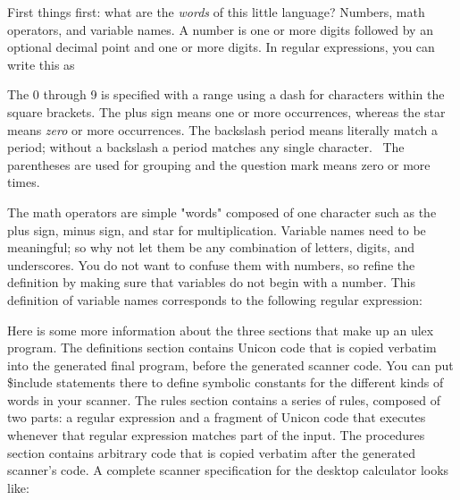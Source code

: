 First things first: what are the \emph{words} of this little language?
Numbers, math operators, and variable names. A number is one or more
digits followed by an optional decimal point and one or more digits. In
regular expressions, you can write this as


The 0 through 9 is specified with a range using a dash for characters
within the square brackets. The plus sign means one or more
occurrences, whereas the star means \textit{zero} or more occurrences.
The backslash period means literally match a period; without a
backslash a period matches any single character. \ The parentheses are
used for grouping and the question mark means zero or more times.

The math operators are simple "words"
composed of one character such as the plus sign, minus sign, and star
for multiplication. Variable names need to be meaningful; so why not
let them be any combination of letters, digits, and underscores. You do
not want to confuse them with numbers, so refine the definition by
making sure that variables do not begin with a number. This definition
of variable names corresponds to the following regular expression: 

\iconcode{
[a-zA-Z\_][a-zA-Z0-9\_]*}

Here is some more information about the three sections that make up an
\textsf{ulex} program. The definitions section contains Unicon code
that is copied verbatim into the generated final program, before the
generated scanner code. You can put \textsf{\$include} statements there
to define symbolic constants for the different kinds of words in your
scanner. The rules section contains a series of rules, composed of two
parts: a regular expression and a fragment of Unicon code that executes
whenever that regular expression matches part of the input. The
procedures section contains arbitrary code that is copied verbatim
after the generated scanner's code. A complete scanner
specification for the desktop calculator looks like:

